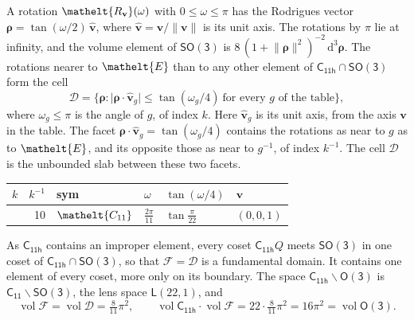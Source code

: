 \documentclass[10pt,a4paper]{article}
\numberwithin{equation}{section}
\newcommand{\eltfont}[1]{{\let\sigma\eltsigma\mathelt{#1}}}
\newcommand{\grp}[1]{\mathsf{#1}}
\newcommand{\cls}[1]{\eltfont{#1}}
\newcommand{\elt}[1]{\eltfont{#1}}
\newcommand{\dirvec}[3]{(#1, #2, #3)}
\newcommand{\unitaxis}{\hat{\mathbf{v}}}
\newcommand{\vv}{\mathbf{v}}
\newcommand{\diff}{\mathrm{d}}
\newcommand{\vol}{\operatorname{vol}}
\newcommand{\rodrigues}{\boldsymbol{\rho}}
\newcommand{\fcell}{\mathcal{D}}
\newcommand{\fdomain}{\mathcal{F}}
\newcommand{\lensspace}[2]{\mathsf{L}(#1, #2)}
\begin{document}
\leavevmode\label{n:vector.rodrigues}\label{n:vector.unitaxis}A rotation $\elt{R_{\vv}}(\omega)$ with $0 \le \omega \le \pi$ has the Rodrigues vector $\rodrigues = \tan(\omega/2)\,\unitaxis$, where $\unitaxis = \vv/\lVert\vv\rVert$ is its unit axis. The rotations by $\pi$ lie at infinity, and the volume element of \href{SO3.pdf}{$\grp{SO(3)}$} is $8\,(1 + \lVert\rodrigues\rVert^2)^{-2}\,\diff^3\rodrigues$.
\leavevmode\label{n:set.cell}The rotations nearer to $\elt{E}$ than to any other element of $\grp{C_{11h}} \cap \grp{SO(3)}$ form the cell
\begin{equation}\label{e:cell}\fcell = \bigl\{\rodrigues : \lvert\rodrigues\cdot\unitaxis_g\rvert \le \tan(\omega_g/4)\ \text{for every $g$ of the table}\bigr\},\end{equation}
where $\omega_g \le \pi$ is the angle of $g$, of index $k$. Here $\unitaxis_g$ is its unit axis, from the axis $\vv$ in the table. The facet $\rodrigues\cdot\unitaxis_g = \tan(\omega_g/4)$ contains the rotations as near to $g$ as to $\elt{E}$, and its opposite those as near to $g^{-1}$, of index $k^{-1}$. The cell $\fcell$ is the unbounded slab between these two facets.
{\small{\renewcommand{\arraystretch}{1.3}\begin{longtable}{@{}rrllll@{}}\toprule
$k$ & $k^{-1}$ & sym & $\omega$ & $\tan(\omega/4)$ & $\vv$\\\midrule\endhead
\bottomrule\endfoot\endlastfoot
1 & 10 & $\cls{C_{11}}$ & $\tfrac{2\pi}{11}$ & $\tan\tfrac{\pi}{22}$ & $\dirvec{0}{0}{1}$\\
\bottomrule\end{longtable}}}

\leavevmode\label{n:set.fundamental}As $\grp{C_{11h}}$ contains an improper element, every coset $\grp{C_{11h}}Q$ meets \href{SO3.pdf}{$\grp{SO(3)}$} in one coset of $\grp{C_{11h}} \cap \grp{SO(3)}$, so that $\fdomain = \fcell$ is a fundamental domain. It contains one element of every coset, more only on its boundary.
\leavevmode\label{n:set.lens}The space $\grp{C_{11h}}\backslash\grp{O(3)}$ is $\grp{C_{11}}\backslash\grp{SO(3)}$, the lens space $\lensspace{22}{1}$, and
\begin{equation}\label{e:volume}\vol\fdomain = \vol\fcell = \tfrac{8}{11}\pi^2,\qquad \vol\grp{C_{11h}}\cdot\vol\fdomain = 22\cdot \tfrac{8}{11}\pi^2 = 16\pi^2 = \vol\grp{O(3)}.\end{equation}
\end{document}
